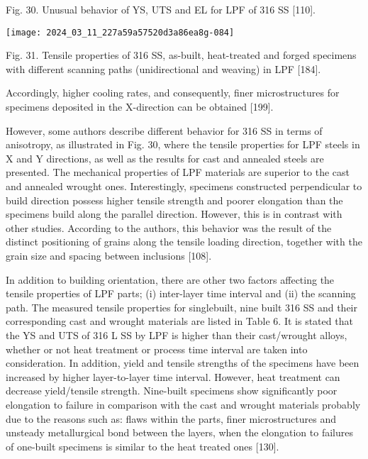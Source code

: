 \documentclass[10pt]{article}
\begin{document}
Fig. 30. Unusual behavior of YS, UTS and EL for LPF of 316 SS [110].

\begin{center}
\texttt{[image: 2024\_03\_11\_227a59a57520d3a86ea8g-084]}
\end{center}

Fig. 31. Tensile properties of 316 SS, as-built, heat-treated and forged specimens with different scanning paths (unidirectional and weaving) in LPF [184].

Accordingly, higher cooling rates, and consequently, finer microstructures for specimens deposited in the X-direction can be obtained [199].

However, some authors describe different behavior for 316 SS in terms of anisotropy, as illustrated in Fig. 30, where the tensile properties for LPF steels in X and Y directions, as well as the results for cast and annealed steels are presented. The mechanical properties of LPF materials are superior to the cast and annealed wrought ones. Interestingly, specimens constructed perpendicular to build direction possess higher tensile strength and poorer elongation than the specimens build along the parallel direction. However, this is in contrast with other studies. According to the authors, this behavior was the result of the distinct positioning of grains along the tensile loading direction, together with the grain size and spacing between inclusions [108].

In addition to building orientation, there are other two factors affecting the tensile properties of LPF parts; (i) inter-layer time interval and (ii) the scanning path. The measured tensile properties for singlebuilt, nine built 316 SS and their corresponding cast and wrought materials are listed in Table 6. It is stated that the YS and UTS of 316 L SS by LPF is higher than their cast/wrought alloys, whether or not heat treatment or process time interval are taken into consideration. In addition, yield and tensile strengths of the specimens have been increased by higher layer-to-layer time interval. However, heat treatment can decrease yield/tensile strength. Nine-built specimens show significantly poor elongation to failure in comparison with the cast and wrought materials probably due to the reasons such as: flaws within the parts, finer microstructures and unsteady metallurgical bond between the layers, when the elongation to failures of one-built specimens is similar to the heat treated ones [130].
\end{document}
